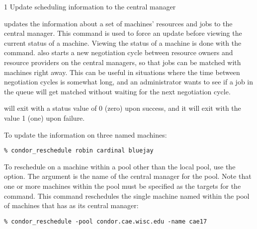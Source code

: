 \begin{ManPage}{\label{man-condor-reschedule}}{1}
{Update scheduling information to the central manager}

\Synopsis {}
\ToolArgsBase

\ToolArgsLocate

\ToolWhere


\Description 

 updates the information about a set of machines' resources
and jobs to the central manager.
This command is used to force an update before viewing the
current status of a machine.
Viewing the status of a machine is done with 
the  command.
 also
starts a new negotiation cycle between resource owners and resource providers
on the central managers, so that jobs can be matched with machines right
away.
This can be useful in situations where the time between negotiation
cycles is somewhat long, and an administrator wants to see if a job 
in the queue will get matched without waiting for the next negotiation cycle.

\begin{Options}
	\ToolArgsBaseDesc \ToolArgsLocateDesc
\end{Options}

\ExitStatus

 will exit with a status value of 0 (zero) upon success,
and it will exit with the value 1 (one) upon failure.

\Examples

To update the information on three named machines:
\begin{verbatim}
% condor_reschedule robin cardinal bluejay
\end{verbatim}

To reschedule on a machine within a pool
other than the local pool, use the  option.
The argument is the name of the central manager for the pool.
Note that one or more machines within the pool must be
specified as the targets for the command.
This command reschedules 
the single machine named  within the
pool of machines that has  as
its central manager:
\begin{verbatim}
% condor_reschedule -pool condor.cae.wisc.edu -name cae17
\end{verbatim}

\end{ManPage}
